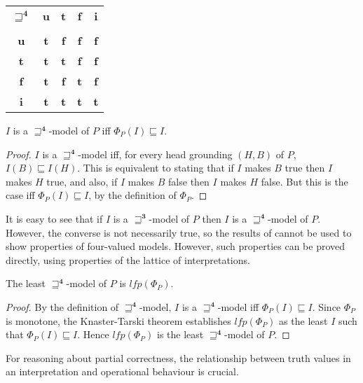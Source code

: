 \documentclass{tlp}
\newcommand{\Tri}{\ensuremath{\mathbf{3}}}
\newcommand{\Quad}{\ensuremath{\mathbf{4}}}
\begin{document}
\begin{center}
\begin{tabular}{|c||c|c|c|c|}
\cline{1-5}
$\sqsupseteq^\Quad$ & \textbf{u} & \textbf{t} & \textbf{f} & \textbf{i}\\
\cline{1-5}
\vspace{-3.9mm} & & & & \\
\cline{1-5}
\textbf{u}          & \textbf{t} & \textbf{f} & \textbf{f} & \textbf{f}\\
\cline{1-5}
\textbf{t}          & \textbf{t} & \textbf{t} & \textbf{f} & \textbf{f}\\
\cline{1-5}
\textbf{f}          & \textbf{t} & \textbf{f} & \textbf{t} & \textbf{f}\\
\cline{1-5}
\textbf{i}          & \textbf{t} & \textbf{t} & \textbf{t} & \textbf{t}\\
\cline{1-5}
\end{tabular}
\end{center}


\begin{proposition} \rm
\label{prop-fourval-sqsubset}
$I$ is a $\sqsupseteq^\Quad$-model of $P$ iff $\Phi_P(I) \sqsubseteq I$.
\end{proposition}

\begin{proof}
$I$ is a $\sqsupseteq^\Quad$-model iff,
for every head grounding $(H, B)$ of $P$, $I(B) \sqsubseteq I(H)$.  
This is equivalent to stating that 
if $I$ makes $B$ true then $I$ makes $H$ true, and also,
if $I$ makes $B$ false then $I$ makes $H$ false.
But this is the case iff $\Phi_P(I) \sqsubseteq I$,
by the definition of $\Phi_P$.
\end{proof}
It is easy to see that if $I$ is a $\sqsupseteq^\Tri$-model of $P$ 
then $I$ is a $\sqsupseteq^\Quad$-model of $P$.
However, the converse is not 
necessarily true, so the results of 
cannot be used to show properties of four-valued models.  
However, such properties can be proved directly,
using properties of the lattice of interpretations.


\begin{proposition} \rm
\label{prop-lfp-lmod}
The least $\sqsupseteq^\Quad$-model of $P$ is $lfp(\Phi_P)$.
\end{proposition}
\begin{proof}
By the definition of $\sqsupseteq^\Quad$-model, $I$ is a 
$\sqsupseteq^\Quad$-model iff $\Phi_P(I) \sqsubseteq I$.
Since $\Phi_P$ is monotone,
the Knaster-Tarski theorem \cite{Tarski} establishes
$lfp(\Phi_P)$ as the least $I$ such that $\Phi_P(I) \sqsubseteq I$.
Hence $lfp(\Phi_P)$ is the least $\sqsupseteq^\Quad$-model of $P$.
\end{proof}
For reasoning about partial correctness, the relationship between truth
values in an interpretation and operational behaviour is crucial.
\end{document}
